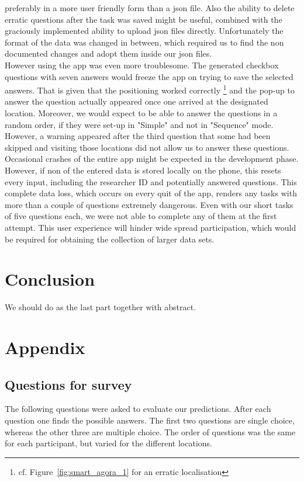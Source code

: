 \documentclass[letterpaper]{article}
\begin{document}
preferably in a more user friendly form than a json file. Also the ability to delete erratic questions after the task was saved
might be useful, combined with the graciously implemented ability to upload json files directly. Unfortunately the format
of the data was changed in between, which required us to find the non documented changes and adopt them inside our json files.\\
\indent However using the app was even more troublesome. The generated checkbox questions with seven answers would freeze
the app on trying to save the selected answers. That is given that the positioning worked correctly
\footnote{cf. Figure~\ref{fig:smart_agora_1} for an erratic localisation} and the pop-up to answer the question actually
appeared once one arrived at the designated location. Moreover, we would expect to be able to answer the questions in a random order,
if they were set-up in "Simple" and not in "Sequence" mode. However, a warning appeared after the third question that some had been skipped
and visiting those locations did not allow us to answer these questions.\\
\indent Occasional crashes of the entire app might be expected in the development phase. However, if non of the entered data
is stored locally on the phone, this resets every input, including the researcher ID and potentially answered questions.
This complete data loss, which occurs on every quit of the app, renders any tasks with more than a couple of questions extremely dangerous.
Even with our short tasks of five questions each, we were not able to complete any of them at the first attempt. This user experience will
hinder wide spread participation, which would be required for obtaining the collection of larger data sets.

\section{Conclusion}
We should do as the last part together with abstract.




\section{Appendix}
\subsection{Questions for survey}\label{app:questions}
The following questions were asked to evaluate our predictions. After each question one finds the possible answers.
The first two questions are single choice, whereas the other three are multiple choice.
The order of questions was the same for each participant, but varied for the different locations.
\end{document}

